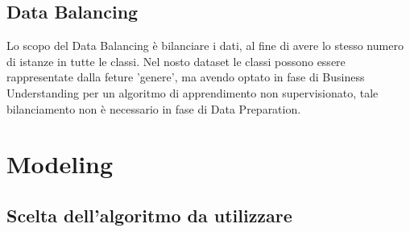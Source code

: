 \documentclass[a4paper, 10pt]{report}
\begin{document}
        \section{Data Balancing}\label{sec:data-balancing}
            Lo scopo del Data Balancing è bilanciare i dati, al fine di avere lo stesso numero di istanze in tutte le classi.
            Nel nosto dataset le classi possono essere rappresentate dalla feture 'genere', ma avendo optato in fase di
            Business Understanding per un algoritmo di apprendimento non supervisionato, tale bilanciamento non è necessario
            in fase di Data Preparation.


    \chapter{Modeling}\label{ch:modeling}


        \section{Scelta dell'algoritmo da utilizzare}\label{sec:scelta-dell'algoritmo-da-utilizzare}
\end{document}
